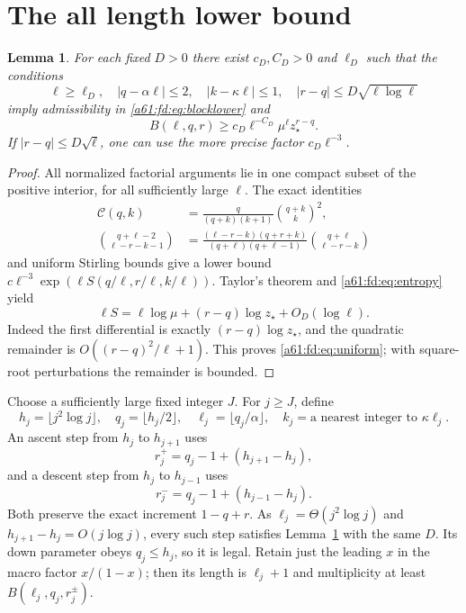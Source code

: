 \documentclass[11pt,letterpaper]{article}
\numberwithin{equation}{section}
\newtheorem{lemma}[theorem]{Lemma}
\theoremstyle{remark}\newtheorem{remark}[theorem]{Remark}
\newcommand{\st}{\star}
\begin{document}
\section{The all length lower bound}
\begin{lemma}\label{a61:fd:lem:uniform}
For each fixed $D>0$ there exist $c_D,C_D>0$ and $\ell_D$ such that the conditions
\[
 \ell\ge\ell_D,\quad |q-\alpha\ell|\le2,\quad
 |k-\kappa\ell|\le1,\quad
 |r-q|\le D\sqrt{\ell\log\ell}
\]
imply admissibility in \eqref{a61:fd:eq:blocklower} and
\begin{equation}\label{a61:fd:eq:uniform}
 B(\ell,q,r)\ge c_D\ell^{-C_D}\mu^\ell z_\st^{r-q}.
\end{equation}
If $|r-q|\le D\sqrt\ell$, one can use the more precise factor $c_D\ell^{-3}$.
\end{lemma}
\begin{proof}
All normalized factorial arguments lie in one compact subset of the positive interior, for all sufficiently large $\ell$. The exact identities
\begin{align*}
 \mathcal C(q,k)&=\frac{q}{(q+k)(k+1)}\binom{q+k}{k}^{\!2},\\
 \binom{q+\ell-2}{\ell-r-k-1}
 &=\frac{(\ell-r-k)(q+r+k)}{(q+\ell)(q+\ell-1)}
 \binom{q+\ell}{\ell-r-k}
\end{align*}
and uniform Stirling bounds give a lower bound
$c\ell^{-3}\exp(\ell S(q/\ell,r/\ell,k/\ell))$. Taylor's theorem and \eqref{a61:fd:eq:entropy} yield
\[
 \ell S=\ell\log\mu+(r-q)\log z_\st+O_D(\log\ell).
\]
Indeed the first differential is exactly $(r-q)\log z_\st$, and the quadratic remainder is $O((r-q)^2/\ell+1)$. This proves \eqref{a61:fd:eq:uniform}; with square-root perturbations the remainder is bounded.
\end{proof}

Choose a sufficiently large fixed integer $J$. For $j\ge J$, define
\[
 h_j=\lfloor j^2\log j\rfloor,\quad q_j=\lfloor h_j/2\rfloor,
 \quad \ell_j=\lfloor q_j/\alpha\rfloor,\quad
 k_j=\text{a nearest integer to }\kappa\ell_j.
\]
An ascent step from $h_j$ to $h_{j+1}$ uses
\[
 r_j^+=q_j-1+(h_{j+1}-h_j),
\]
and a descent step from $h_j$ to $h_{j-1}$ uses
\[
 r_j^-=q_j-1+(h_{j-1}-h_j).
\]
Both preserve the exact increment $1-q+r$. As $\ell_j=\Theta(j^2\log j)$ and $h_{j+1}-h_j=O(j\log j)$, every such step satisfies Lemma~\ref{a61:fd:lem:uniform} with the same $D$. Its down parameter obeys $q_j\le h_j$, so it is legal. Retain just the leading $x$ in the macro factor $x/(1-x)$; then its length is $\ell_j+1$ and multiplicity at least $B(\ell_j,q_j,r_j^{\pm})$.
\end{document}
